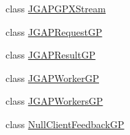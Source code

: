 \begin{DoxyCompactItemize}
class \hyperlink{classorg_1_1jgap_1_1distr_1_1grid_1_1gp_1_1_j_g_a_p_g_p_x_stream}{J\-G\-A\-P\-G\-P\-X\-Stream}
\item 
class \hyperlink{classorg_1_1jgap_1_1distr_1_1grid_1_1gp_1_1_j_g_a_p_request_g_p}{J\-G\-A\-P\-Request\-G\-P}
\item 
class \hyperlink{classorg_1_1jgap_1_1distr_1_1grid_1_1gp_1_1_j_g_a_p_result_g_p}{J\-G\-A\-P\-Result\-G\-P}
\item 
class \hyperlink{classorg_1_1jgap_1_1distr_1_1grid_1_1gp_1_1_j_g_a_p_worker_g_p}{J\-G\-A\-P\-Worker\-G\-P}
\item 
class \hyperlink{classorg_1_1jgap_1_1distr_1_1grid_1_1gp_1_1_j_g_a_p_workers_g_p}{J\-G\-A\-P\-Workers\-G\-P}
\item 
class \hyperlink{classorg_1_1jgap_1_1distr_1_1grid_1_1gp_1_1_null_client_feedback_g_p}{Null\-Client\-Feedback\-G\-P}
\end{DoxyCompactItemize}
